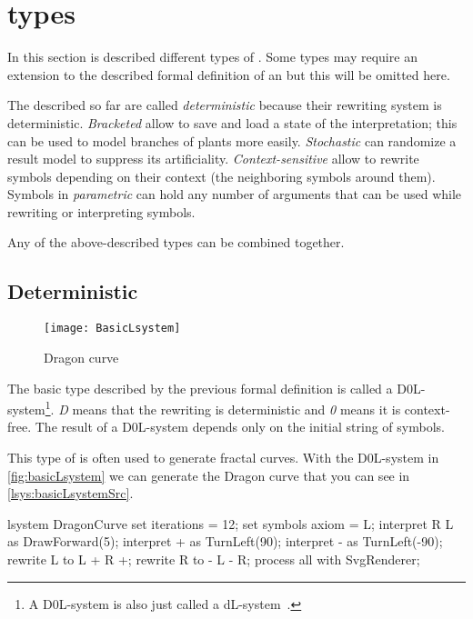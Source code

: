
\section{\lsystem types}
\label{sec:lsysTypes}

In this section is described different types of \lsystems.
Some types may require an extension to the described formal definition of an \lsystem but this will be omitted here.

The \lsystems described so far are called \emph{deterministic \lsystems} because their rewriting system is deterministic.
\emph{Bracketed \lsystems} allow to save and load a state of the interpretation;
	this can be used to model branches of plants more easily.
\emph{Stochastic \lsystems} can randomize a result model to suppress its artificiality.
\emph{Context-sensitive \lsystems} allow to rewrite symbols depending on their context (the neighboring symbols around them).
Symbols in \emph{parametric \lsystems} can hold any number of arguments that can be used while rewriting or interpreting symbols.

Any of the above-described types can be combined together.



\subsection{Deterministic \lsystems}

\newcommand{\dzerolsystem}{\mbox{D0L-system}\xspace}
\newcommand{\dlsystem}{\mbox{dL-system}\xspace}


\begin{wrapfigure}{r}{0.50\textwidth}
	\vspace{-30pt}
	\texttt{[image: BasicLsystem]}
	\caption{Dragon curve}
	\label{fig:basicLsystem}
\end{wrapfigure}


The basic \lsystem type described by the previous formal definition is called a \dzerolsystem\footnote{A \dzerolsystem is also just called a \dlsystem~\cite{Zar04}.}.
\emph{D} means that the rewriting is deterministic and \emph{0} means it is context-free.
The result of a \dzerolsystem depends only on the initial string of symbols.

This type of \lsystem is often used to generate fractal curves.
With the \dzerolsystem in \autoref{fig:basicLsystem} we can generate the Dragon curve that you can see in \autoref{lsys:basicLsystemSrc}.

\begin{Lsystem}[label=lsys:basicLsystemSrc,caption={\dzerolsystem for the generation of the Dragon curve (\autoref{fig:basicLsystem})}]
lsystem DragonCurve {
	set iterations = 12;
	set symbols axiom = L;
	interpret R L as DrawForward(5);
	interpret + as TurnLeft(90);
	interpret - as TurnLeft(-90);
	rewrite L to L + R +;
	rewrite R to - L - R;
}
process all with SvgRenderer;
\end{Lsystem}


